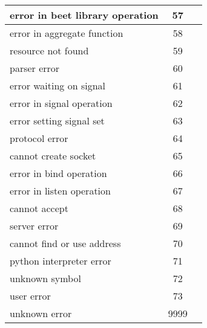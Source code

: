 \begin{center}
\begin{longtable}{||l||c||l||}
error in beet library operation &     57 & \\\hline\hline
error in aggregate function     &     58 & \\\hline\hline
resource not found              &     59 & \\\hline\hline
parser error                    &     60 & \\\hline\hline
error waiting on signal         &     61 & \\\hline\hline
error in signal operation       &     62 & \\\hline\hline
error setting signal set        &     63 & \\\hline\hline
protocol error                  &     64 & \\\hline\hline
cannot create socket            &     65 & \\\hline\hline
error in bind operation         &     66 & \\\hline\hline
error in listen operation       &     67 & \\\hline\hline
cannot accept                   &     68 & \\\hline\hline
server error                    &     69 & \\\hline\hline
cannot find or use address      &     70 & \\\hline\hline
python interpreter error        &     71 & \\\hline\hline
unknown symbol                  &     72 & \\\hline\hline
user error                      &     73 & \\\hline\hline
unknown error                   &   9999 & \\\hline\hline
\end{longtable}
\end{center}
\egroup
